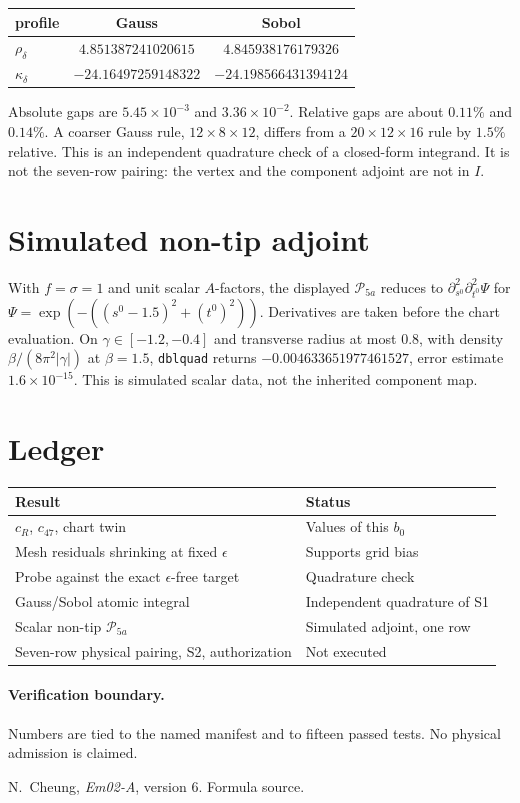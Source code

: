\documentclass[11pt,letterpaper]{article}
\numberwithin{equation}{section}
\theoremstyle{definition}
\begin{document}
\begin{center}
\small
\begin{tabular}{lcc}
\toprule
profile & Gauss & Sobol\\
\midrule
\(\rho_\delta\) & \(4.851387241020615\) & \(4.845938176179326\)\\
\(\kappa_\delta\) & \(-24.16497259148322\) & \(-24.198566431394124\)\\
\bottomrule
\end{tabular}
\end{center}
Absolute gaps are \(5.45\times 10^{-3}\) and \(3.36\times 10^{-2}\).
Relative gaps are about \(0.11\%\) and \(0.14\%\).
A coarser Gauss rule, \(12\times 8\times 12\), differs from a
\(20\times 12\times 16\) rule by \(1.5\%\) relative.
This is an independent quadrature check of a closed-form integrand.
It is not the seven-row pairing: the vertex and the component
adjoint are not in \(I\).

\section{Simulated non-tip adjoint}
With \(f=\sigma=1\) and unit scalar \(A\)-factors, the displayed
\(\mathscr P_{5a}\) reduces to
\(\partial_{s^0}^2\partial_{t^0}^2\Psi\) for
\(\Psi=\exp(-((s^0-1.5)^2+(t^0)^2))\).
Derivatives are taken before the chart evaluation.
On \(\gamma\in[-1.2,-0.4]\) and transverse radius at most \(0.8\),
with density \(\beta/(8\pi^2|\gamma|)\) at \(\beta=1.5\),
\texttt{dblquad} returns
\(-0.004633651977461527\),
error estimate \(1.6\times 10^{-15}\).
This is simulated scalar data, not the inherited component map.

\section{Ledger}
\begin{center}
\small
\begin{tabularx}{\linewidth}{@{}YY@{}}
\toprule
Result & Status\\
\midrule
\(c_R\), \(c_{47}\), chart twin &
Values of this \(b_0\)\\[0.3em]
Mesh residuals shrinking at fixed \(\epsilon\) &
Supports grid bias\\[0.3em]
Probe against the exact \(\epsilon\)-free target &
Quadrature check\\[0.3em]
Gauss/Sobol atomic integral &
Independent quadrature of S1\\[0.3em]
Scalar non-tip \(\mathscr P_{5a}\) &
Simulated adjoint, one row\\[0.3em]
Seven-row physical pairing, S2, authorization &
Not executed\\
\bottomrule
\end{tabularx}
\end{center}

\paragraph{Verification boundary.}
Numbers are tied to the named manifest and to fifteen passed tests.
No physical admission is claimed.

\begin{thebibliography}{99}
N.~Cheung, \emph{Em02-A}, version 6. Formula source.
\end{thebibliography}
\end{document}

